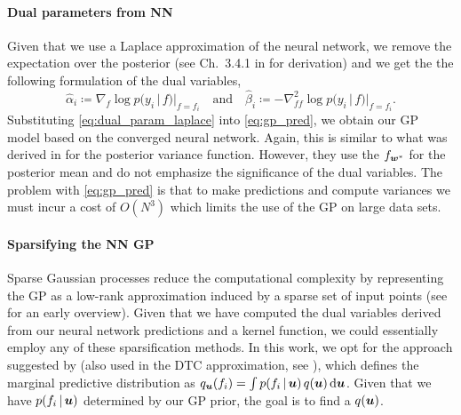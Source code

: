 \documentclass{article} %
\renewcommand{\mid}{\,|\,}
\begin{document}
\paragraph{Dual parameters from NN}
Given that we use a Laplace approximation of the neural network, we remove the expectation over the posterior (see Ch.~3.4.1 in \cite{rasmussen2006gaussian} for derivation) and we get the the following formulation of the dual variables,
%
\begin{equation}
  \label{eq:dual_param_laplace}
  \hat{\alpha}_i \coloneqq \nabla_{f}\log p(y_i \mid f) |_{f=f_i}
  \quad \text{and} \quad
  \hat{\beta}_i \coloneqq - \nabla^2_{ff}\log p(y_i \mid f) |_{f=f_i}.
\end{equation}
%
Substituting \cref{eq:dual_param_laplace} into \cref{eq:gp_pred}, we obtain our GP model based on the converged neural network. Again, this is similar to what was derived in \citet{immer2021improving} for the posterior variance function. However, they use the $f_{{\bm{w}}^*}$ for the posterior mean and do not emphasize the significance of the dual variables. The problem with \cref{eq:gp_pred} is that to make predictions and compute variances we must incur a cost of $O(N^3)$ which limits the use of the GP on large data sets.

\paragraph{Sparsifying the NN GP}
\label{sec:sparse-dual-gp}
%
Sparse Gaussian processes reduce the computational complexity by representing the GP as a low-rank approximation induced by a sparse set of input points (see \cite{quinonero2005unifying} for an early overview). Given that we have computed the dual variables derived from our neural network predictions and a kernel function, we could essentially employ any of these sparsification methods. In this work, we opt for the approach suggested by \citet{titsias2009variational} (also used in the DTC approximation, see \cite{quinonero2005unifying}), which defines the marginal predictive distribution as $q_{\vu}(f_i)  = \int p(f_i  \mid \vu) \, q(\vu) \, \mathrm{d}\vu$. Given that we have $p(f_i \mid \vu)$ determined by our GP prior, the goal is to find a $q({\bm{u}})$.
\end{document}
